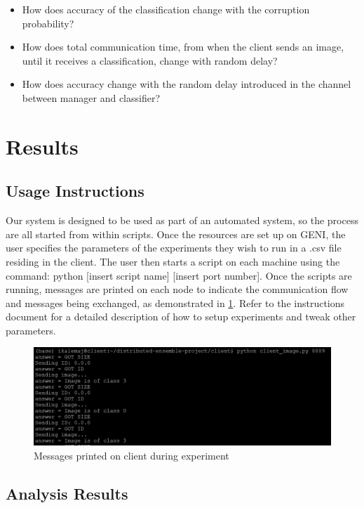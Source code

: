 \documentclass[11pt]{article}
\begin{document}
\begin{itemize}
	\item How does accuracy of the classification change with the corruption probability?
	\item How does total communication time, from when the client sends an image, until it receives a classification, change with random delay?
	\item  How does accuracy change with the random delay introduced in the channel between manager and classifier?
\end{itemize}



\section{Results}

\subsection{Usage Instructions}

Our system is designed to be used as part of an automated system, so the process are all started from within scripts. Once the resources are set up on GENI, the user specifies the parameters of the experiments they wish to run in a .csv file residing in the client. The user then starts a script on each machine using the command: python [insert script name] [insert port number]. Once the scripts are running, messages are printed on each node to indicate the communication flow and messages being exchanged, as demonstrated in \ref{fig:client_screenshot}. Refer to the instructions document for a detailed description of how to setup experiments and tweak other parameters. 

\begin{figure}[t]
	\centering
	\includegraphics[scale=0.8]{client_screenshot.png}
	\caption{Messages printed on client during experiment}
	\label{fig:client_screenshot}
\end{figure}

\subsection{Analysis Results}
\end{document}
